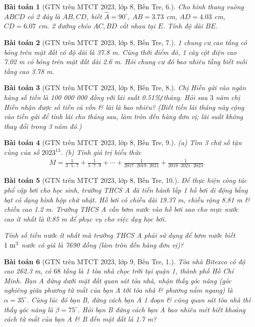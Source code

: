 \documentclass{article}
\newtheorem{baitoan}{Bài toán}
\begin{document}
\begin{baitoan}[GTN trên MTCT 2023, lớp 8, Bến Tre, 6.]
	Cho hình thang vuông $ABCD$ có 2 đáy là $AB,CD$, biết $\widehat{A} = 90^\circ$, $AB = 3.73$ \emph{cm}, $AD = 4.03$ \emph{cm}, $CD = 6.07$ \emph{cm}. 2 đường chéo $AC,BD$ cắt nhau tại $E$. Tính độ dài $BE$.
\end{baitoan}

\begin{baitoan}[GTN trên MTCT 2023, lớp 8, Bến Tre, 7.]
	1 chung cư cao tầng có bóng trên mặt đất có độ dài là \emph{37.8 m}. Cùng thời điểm đó, 1 cây cột điện cao \emph{7.02 m} có bóng trên mặt đất dài \emph{2.6 m}. Hỏi chung cư đó bao nhiêu tầng biết mỗi tầng cao \emph{3.78 m}.
\end{baitoan}

\begin{baitoan}[GTN trên MTCT 2023, lớp 8, Bến Tre, 8.]
	Chị Hiền gửi vào ngân hàng số tiền là \emph{100 000 000 đồng} với lãi suất \emph{0.51\%\texttt{/}tháng}. Hỏi sau $3$ năm chị Hiền nhận được số tiền cả vốn \& lãi là bao nhiêu? (Biết tiền lãi tháng này cộng vào tiền gửi để tính lãi cho tháng sau, làm tròn đến hàng đơn vị; lãi suất không thay đổi trong 3 năm đó.)
\end{baitoan}

\begin{baitoan}[GTN trên MTCT 2023, lớp 8, Bến Tre, 9.]
	(a) Tìm 3 chữ số tận cùng của số $2023^{13}$. (b) Tính giá trị biểu thức
	\begin{align*}
		M = \frac{1}{3\cdot5\cdot7} + \frac{1}{5\cdot7\cdot9} + \cdots + \frac{1}{2017\cdot2019\cdot2021} + \frac{1}{2019\cdot2021\cdot2023}.
	\end{align*}
\end{baitoan}

\begin{baitoan}[GTN trên MTCT 2023, lớp 8, Bến Tre, 10.]
	Để thực hiện công tác phổ cập bơi cho học sinh, trường THCS A đã tiến hành lắp 1 hồ bơi di động bằng bạt có dạng hình hộp chữ nhật. Hồ bơi có chiều dài \emph{19.37 m}, chiều rộng \emph{8.81 m} \& chiều cao \emph{1.2 m}. Trường THCS A cần bơm nước vào hồ bơi sao cho mực nước cao ít nhất là \emph{0.85 m} để phục vụ cho việc dạy học bơi.
	
	Tính số tiền nước ít nhất mà trường THCS A phải sử dụng để bơm nước biết $\rm 1\ m^3$ nước có giá là \emph{7690 đồng} (làm tròn đến hàng đơn vị)?
\end{baitoan}

\begin{baitoan}[GTN trên MTCT 2023, lớp 9, Bến Tre, 1.]
	Tòa nhà Bitexco có độ cao \emph{262.3 m}, có $68$ tầng là 1 tòa nhà chọc trời tại quận 1, thành phố Hồ Chí Minh. Bạn A đứng dưới mặt đất quan sát tòa nhà, nhận thấy góc nâng (góc nghiêng giữa phương từ mắt của bạn A tới tòa nhà \& phương nằm ngang) là $\alpha = 35^\circ$. Cùng lúc đó bạn B, đứng cách bạn A 1 đoạn \& cũng quan sát tòa nhà thì thấy góc nâng là $\beta = 75^\circ$. Hỏi bạn B đứng cách bạn A bao nhiêu mét biết khoảng cách từ mắt của bạn A \& B đến mặt đất là \emph{1.7 m}?
\end{baitoan}
\end{document}
